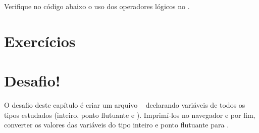 

Verifique no código abaixo o uso dos operadores lógicos no \php.



\section{Exercícios}
\label{cap4-exercicios}


\section{Desafio!}
\label{cap4-desafio}
O desafio deste capítulo é criar um arquivo \phpextensao~ declarando variáveis de todos os tipos
estudados (inteiro, ponto flutuante e \tipostring). Imprimí-los no navegador e por fim, converter
os valores das variáveis do tipo inteiro e ponto flutuante para \tipostring.
